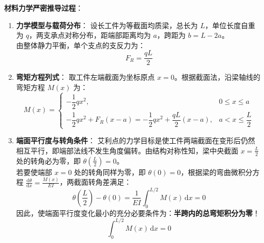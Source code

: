 \documentclass[11pt,a4paper]{ctexart}
\begin{document}
\vspace{6pt}
\noindent\textbf{材料力学严密推导过程}：
\begin{enumerate}[leftmargin=1.5em, itemsep=4pt]
    \item \textbf{力学模型与载荷分布}：
    设长工件为等截面均质梁，总长为 $L$，单位长度自重为 $q$，两支承点对称分布，距端部距离均为 $a$，跨距为 $b = L - 2a$。\\
    由整体静力平衡，单个支点的支反力为：
    \begin{equation}
    F_R = \frac{q L}{2}
    \end{equation}
    
    \item \textbf{弯矩方程列式}：
    取工件左端截面为坐标原点 $x = 0$。根据截面法，沿梁轴线的弯矩方程 $M(x)$ 为：
    \begin{equation}
    M(x) = 
    \begin{cases}
    -\dfrac{1}{2} q x^2, & 0 \le x \le a \\
    -\dfrac{1}{2} q x^2 + F_R (x - a) = -\dfrac{1}{2} q x^2 + \dfrac{q L}{2}(x - a), & a < x \le \dfrac{L}{2}
    \end{cases}
    \end{equation}
    
    \item \textbf{端面平行度与转角条件}：
    艾利点的力学目标是使工件两端截面在变形后仍然相互平行，即端部法线不发生角度偏转。由结构对称性知，梁中央截面 $x = \frac{L}{2}$ 处的转角必为零，即 $\theta\left(\frac{L}{2}\right) = 0$。\\
    若要使端部 $x = 0$ 处的转角同样为零，即 $\theta(0) = 0$，根据梁的弯曲微积分方程 $\frac{\mathrm{d}\theta}{\mathrm{d}x} = \frac{M(x)}{EI}$，两截面转角差满足：
    \begin{equation}
    \theta\left(\frac{L}{2}\right) - \theta(0) = \frac{1}{EI} \int_{0}^{L/2} M(x) \,\mathrm{d}x = 0
    \end{equation}
    因此，使端面平行度变化最小的充分必要条件为：\textbf{半跨内的总弯矩积分为零}！
    \begin{equation}
    \int_{0}^{L/2} M(x) \,\mathrm{d}x = 0
    \end{equation}


\end{enumerate}
\end{document}
